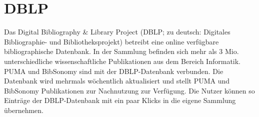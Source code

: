 \section{DBLP}
\label{dblp}
Das Digital Bibliography \& Library Project (DBLP; zu deutsch: Digitales Bibliographie- und Bibliotheksprojekt) betreibt eine online verfügbare bibliographische Datenbank. In der Sammlung befinden sich mehr als 3 Mio. unterschiedliche wissenschaftliche Publikationen aus dem Bereich Informatik.\newline
PUMA und BibSonomy sind mit der DBLP-Datenbank verbunden. Die Datenbank wird mehrmals wöchentlich aktualisiert und stellt PUMA und BibSonomy Publikationen zur Nachnutzung zur Verfügung. \newline
Die Nutzer können so Einträge der DBLP-Datenbank mit ein paar Klicks in die eigene Sammlung übernehmen. 
